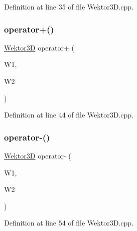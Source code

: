 Definition at line 35 of file Wektor3\+D.\+cpp.

\mbox{\label{_wektor3_d_8hh_a1de808fbd72c8b788a0a88ac119b8a81}} 
\subsubsection{\texorpdfstring{operator+()}{operator+()}}
{\footnotesize\ttfamily \hyperlink{_wektor3_d_8hh_ac353a272b38b4ad342f7181ad7bdb91a}{Wektor3D} operator+ (\begin{DoxyParamCaption}\item[{\hyperlink{_wektor3_d_8hh_ac353a272b38b4ad342f7181ad7bdb91a}{Wektor3D}}]{W1,  }\item[{\hyperlink{_wektor3_d_8hh_ac353a272b38b4ad342f7181ad7bdb91a}{Wektor3D}}]{W2 }\end{DoxyParamCaption})}



Definition at line 44 of file Wektor3\+D.\+cpp.

\mbox{\label{_wektor3_d_8hh_a71e2010b0b6abfb4e8a6507eb5c9ebe5}} 
\subsubsection{\texorpdfstring{operator-\/()}{operator-()}}
{\footnotesize\ttfamily \hyperlink{_wektor3_d_8hh_ac353a272b38b4ad342f7181ad7bdb91a}{Wektor3D} operator-\/ (\begin{DoxyParamCaption}\item[{\hyperlink{_wektor3_d_8hh_ac353a272b38b4ad342f7181ad7bdb91a}{Wektor3D}}]{W1,  }\item[{\hyperlink{_wektor3_d_8hh_ac353a272b38b4ad342f7181ad7bdb91a}{Wektor3D}}]{W2 }\end{DoxyParamCaption})}



Definition at line 54 of file Wektor3\+D.\+cpp.

\mbox{\label{_wektor3_d_8hh_a55d3a49ea2a060a1d4712feb3811e68e}} 
